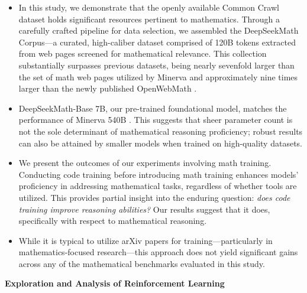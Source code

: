 \begin{itemize}[topsep=0pt]
    \item In this study, we demonstrate that the openly available Common Crawl dataset holds significant resources pertinent to mathematics. Through a carefully crafted pipeline for data selection, we assembled the DeepSeekMath Corpus—a curated, high-caliber dataset comprised of 120B tokens extracted from web pages screened for mathematical relevance. This collection substantially surpasses previous datasets, being nearly sevenfold larger than the set of math web pages utilized by Minerva \citep{minerva} and approximately nine times larger than the newly published OpenWebMath \citep{openwebmath}.

\item DeepSeekMath-Base 7B, our pre-trained foundational model, matches the performance of Minerva 540B \citep{minerva}. This suggests that sheer parameter count is not the sole determinant of mathematical reasoning proficiency; robust results can also be attained by smaller models when trained on high-quality datasets.

\item We present the outcomes of our experiments involving math training. Conducting code training before introducing math training enhances models' proficiency in addressing mathematical tasks, regardless of whether tools are utilized. This provides partial insight into the enduring question: \textit{does code training improve reasoning abilities?} Our results suggest that it does, specifically with respect to mathematical reasoning.

\item While it is typical to utilize arXiv papers for training—particularly in mathematics-focused research—this approach does not yield significant gains across any of the mathematical benchmarks evaluated in this study.
\end{itemize}

\textbf{Exploration and Analysis of Reinforcement Learning}

